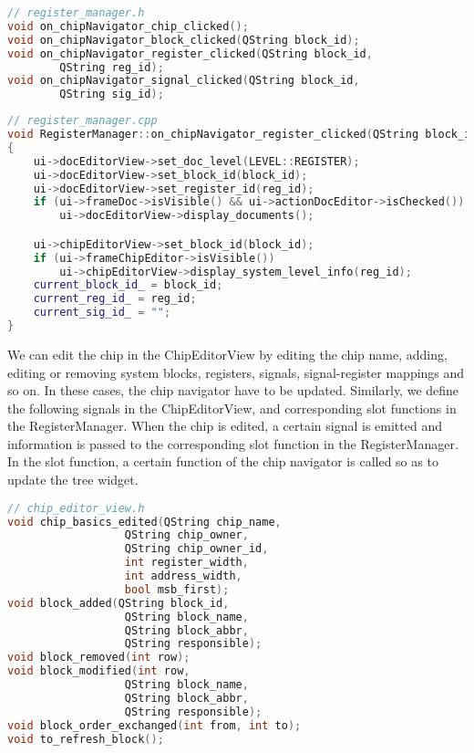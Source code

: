 \begin{lstlisting}[language=C++]
// register_manager.h
void on_chipNavigator_chip_clicked();
void on_chipNavigator_block_clicked(QString block_id);
void on_chipNavigator_register_clicked(QString block_id, 
        QString reg_id);
void on_chipNavigator_signal_clicked(QString block_id,
        QString sig_id);
\end{lstlisting}

\begin{lstlisting}[language=C++]
// register_manager.cpp
void RegisterManager::on_chipNavigator_register_clicked(QString block_id, QString reg_id)
{
    ui->docEditorView->set_doc_level(LEVEL::REGISTER);
    ui->docEditorView->set_block_id(block_id);
    ui->docEditorView->set_register_id(reg_id);
    if (ui->frameDoc->isVisible() && ui->actionDocEditor->isChecked()) 
        ui->docEditorView->display_documents();

    ui->chipEditorView->set_block_id(block_id);
    if (ui->frameChipEditor->isVisible()) 
        ui->chipEditorView->display_system_level_info(reg_id);
    current_block_id_ = block_id;
    current_reg_id_ = reg_id;
    current_sig_id_ = "";
}
\end{lstlisting}

We can edit the chip in the ChipEditorView by editing the chip name, adding, editing or removing system blocks, registers, signals, signal-register mappings and so on. In these cases, the chip navigator have to be updated. Similarly, we define the following signals in the ChipEditorView, and corresponding slot functions in the RegisterManager. When the chip is edited, a certain signal is emitted and information is passed to the corresponding slot function in the RegisterManager. In the slot function, a certain function of the chip navigator is called so as to update the tree widget.

\begin{lstlisting}[language=C++]
// chip_editor_view.h
void chip_basics_edited(QString chip_name, 
                  QString chip_owner, 
                  QString chip_owner_id, 
                  int register_width, 
                  int address_width, 
                  bool msb_first);
void block_added(QString block_id, 
                  QString block_name, 
                  QString block_abbr, 
                  QString responsible);
void block_removed(int row);
void block_modified(int row, 
                  QString block_name, 
                  QString block_abbr, 
                  QString responsible);
void block_order_exchanged(int from, int to);
void to_refresh_block(); 
\end{lstlisting}

